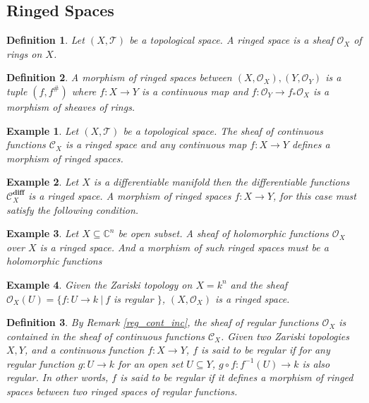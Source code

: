 \documentclass{article}
\newtheorem{definition}{Definition}[section]
\newtheorem{example}{Example}[section]
\numberwithin{equation}{section}
\begin{document}
\subsection{Ringed Spaces}

\begin{definition}
Let $(X,\mathcal{T})$ be a topological space. A ringed space is a sheaf $\mathcal{O}_X$ of rings on $X$. 
\end{definition}

\begin{definition}
A morphism of ringed spaces between $(X,\mathcal{O}_X),(Y,\mathcal{O}_Y)$ is a tuple $(f,f^{\#})$ where $f:X\to Y$ is a continuous map and $f:\mathcal{O}_Y\to f_*\mathcal{O}_X$ is a morphism of sheaves of rings. 
\end{definition}

\begin{example}
Let $(X,\mathcal{T})$ be a topological space. The sheaf of continuous functions $\mathcal{C}_X$ is a ringed space and any continuous map $f:X\to Y$ defines a morphism of ringed spaces.

\end{example}
\begin{example}
Let $X$ is a differentiable manifold then the differentiable functions $\mathcal{C}^{\mathbf{diff}}_X$ is a ringed space. A morphism of ringed spaces $f:X\to Y$, for this case must satisfy the following condition.
\end{example}

\begin{example}
Let $X\subseteq\mathbb{C}^n$ be open subset. A sheaf of holomorphic functions $\mathcal{O}_X$ over $X$ is a ringed space. And a morphism of such ringed spaces must be a holomorphic functions
\end{example}

\begin{example}
Given the Zariski topology on $X=k^n$ and the sheaf $\mathcal{O}_X(U) = \{f:U\to k\:|\: f$ is regular $\}$, $(X,\mathcal{O}_X)$ is a ringed space.
\end{example}

\begin{definition}
By Remark \ref{reg_cont_inc}, the sheaf of regular functions $\mathcal{O}_X$ is contained in the sheaf of continuous functions $\mathcal{C}_X$. Given two Zariski topologies $X,Y$, and a continuous function $f:X\to Y$, $f$ is said to be regular if 
for any regular function $g:U\to k$ for an open set $U\subseteq Y$, $g\circ f:f^{-1}(U)\to k$ is also regular. In other words, $f$ is said to be regular if it defines a morphism of ringed spaces between two ringed spaces of regular functions. 
\end{definition}
\end{document}
